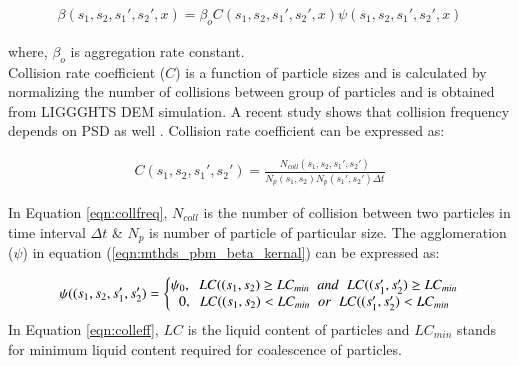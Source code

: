 \documentclass[preprint,10pt,authoryear,review]{elsarticle}
\begin{document}
\begin{linenumbers}
\begin{align}
\beta(s_1,s_2,s_1',s_2',x) = \beta_oC(s_1,s_2,s_1',s_2',x)\psi(s_1,s_2,s_1',s_2',x)
\label{eqn:mthds_pbm_beta_kernal}
\end{align}

where, $\beta_o$ is aggregation rate constant.\\
Collision rate coefficient ($C$) is a function of particle sizes and is calculated by normalizing the 
number of collisions between group of particles \citep{gantt2006} and is obtained from LIGGGHTS 
DEM simulation. A recent study shows that collision frequency depends on PSD as well 
\citep{sen2014}. Collision rate coefficient can be expressed as:

\begin{align}
C(s_1,s_2,s_1',s_2')=\frac{N_{coll}(s_1,s_2,s_1',s_2')}{N_p(s_1,s_2)N_p(s_1',s_2')\Delta t}
\label{eqn:collfreq}
\end{align}

In Equation \ref{eqn:collfreq}, $N_{coll}$ is the number of collision between two particles in 
time interval $\Delta t$ \& $N_p$ is number of particle of particular size. The agglomeration 
($\psi$) in equation (\ref{eqn:mthds_pbm_beta_kernal}) can be expressed as:

\begin{align}
\psi((s_1,s_2,s_1',s_2') = 
\left\{\begin{matrix}
\psi_0,\hspace{0.2cm} LC((s_1,s_2) \geq LC_{min}\hspace{0.2cm} and\hspace{0.2cm} LC((s_1',s_2') \geq LC_{min}	\\ 
0,\hspace{0.2cm} LC((s_1,s_2) < LC_{min}\hspace{0.2cm} or\hspace{0.2cm} LC((s_1',s_2') < LC_{min}
\end{matrix}\right.
\label{eqn:colleff}
\end{align}
 In Equation \ref{eqn:colleff}, $LC$ is the liquid content of particles and $LC_{min}$ stands for minimum 
 liquid content required for coalescence of particles. 




\end{linenumbers}
\end{document}
